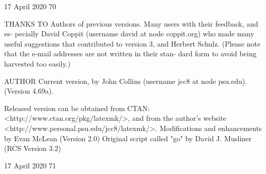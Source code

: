                                  17 April 2020                              70








THANKS TO
       Authors  of previous versions.  Many users with their feedback, and es-
       pecially David Coppit (username david at node coppit.org) who made many
       useful  suggestions  that contributed to version 3, and Herbert Schulz.
       (Please note that the e-mail addresses are not written in  their  stan-
       dard form to avoid being harvested too easily.)

AUTHOR
       Current  version,  by  John  Collins  (username  jcc8 at node psu.edu).
       (Version 4.69a).

       Released     version     can      be      obtained      from      CTAN:
       <http://www.ctan.org/pkg/latexmk/>,   and  from  the  author's  website
       <http://www.personal.psu.edu/jcc8/latexmk/>.
       Modifications and enhancements by Evan McLean (Version 2.0)
       Original script called "go" by David J. Musliner (RCS Version 3.2)









































                                 17 April 2020                              71



